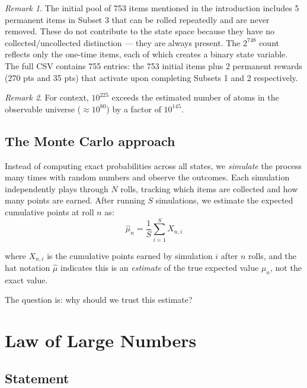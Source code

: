 \documentclass[11pt,a4paper]{article}
\theoremstyle{remark}
\newtheorem*{remark}{Remark}
\begin{document}
\begin{remark}
The initial pool of 753 items mentioned in the introduction includes 5 permanent items in Subset 3 that can be rolled repeatedly and are never removed. These do not contribute to the state space because they have no collected/uncollected distinction --- they are always present. The $2^{748}$ count reflects only the one-time items, each of which creates a binary state variable. The full CSV contains 755 entries: the 753 initial items plus 2 permanent rewards (270 pts and 35 pts) that activate upon completing Subsets 1 and 2 respectively.
\end{remark}

\begin{remark}
For context, $10^{225}$ exceeds the estimated number of atoms in the observable universe ($\approx 10^{80}$) by a factor of $10^{145}$.
\end{remark}

\subsection{The Monte Carlo approach}

Instead of computing exact probabilities across all states, we \emph{simulate} the process many times with random numbers and observe the outcomes. Each simulation independently plays through $N$ rolls, tracking which items are collected and how many points are earned. After running $S$ simulations, we estimate the expected cumulative points at roll $n$ as:
\[
\hat{\mu}_n = \frac{1}{S} \sum_{i=1}^{S} X_{n,i}
\]

where $X_{n,i}$ is the cumulative points earned by simulation $i$ after $n$ rolls, and the hat notation $\hat{\mu}$ indicates this is an \emph{estimate} of the true expected value $\mu_n$, not the exact value.

The question is: why should we trust this estimate?

\section{Law of Large Numbers}

\subsection{Statement}
\end{document}
